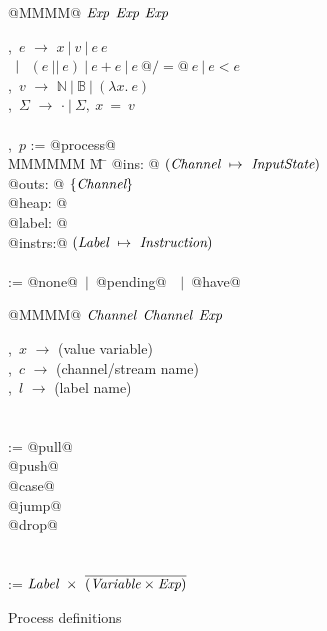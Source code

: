 
\begin{figure}
\begin{minipage}[t]{0.4\textwidth}
\begin{tabbing}
\Instr \TABDEF @MMMM@  \TABSKIP $\textit{Exp}$ \TABSKIP $\textit{Exp}$ \TABSKIP $\textit{Exp}$ \kill

\Exp,~$e$ \> $\to$ \> $x~|~v~|~e~e $ \\
  \> $\enskip|~$ \> $ (e~||~e) ~|~ e+e ~|~ e~@/=@~e ~|~ e < e$ \\
\Value,~$v$ \> $\to$ \> $\mathbb{N}~|~\mathbb{B}~|~(\lambda{}x.~e)$ \\
\Heap,~$\Sigma$ \> $\to$ \> $\cdot~|~\Sigma,~x~=~v$ \\
\\

\Proc,~$p$ \>:=\> @process@ \\
MMMMMM \= M \= \kill
\> \> @ins:   @  $(\textit{Channel} ~\mapsto~ \textit{InputState})$ \\
\> \> @outs:  @  $\{ \textit{Channel} \}$ \\
\> \> @heap:  @  \Heap \\
\> \> @label: @  \Label \\
\> \> @instrs:@  $(\textit{Label} ~\mapsto~ \textit{Instruction})$ \\
\\
\Instr \TABDEF \kill
\InputState \> := \> @none@~$|$~@pending@~\Value~$|$~@have@

\end{tabbing}
\end{minipage}
\begin{minipage}[t]{0.05\textwidth}
\quad
\end{minipage}
\begin{minipage}[t]{0.4\textwidth}
\begin{tabbing}
\Instr \TABDEF @MMMM@  \TABSKIP $\textit{Channel}$ \TABSKIP $\textit{Channel}$ \TABSKIP $\textit{Exp}$ \kill

\Var,~$x$ \> $\to$ \> (value variable) \\
\Chan,~$c$ \> $\to$ \> (channel/stream name) \\
\Label,~$l$ \> $\to$ \> (label name) \\
\\
\\

\Instr
    \> :=\> @pull@  \> \Chan  \> \Var  \> \Next \\
    \TABALT @push@  \> \Chan  \> \Exp  \> \Next \\
    \TABALT @case@  \> \Exp   \> \Next \> \Next \\
    \TABALT @jump@  \>        \>       \> \Next \\
    \TABALT @drop@  \> \Chan  \>       \> \Next \\
\\
\\
\Next \> := \> $\textit{Label}~\times~\overline{(\textit{Variable} \times \textit{Exp})}$ \\
\end{tabbing}
\end{minipage}
\caption{Process definitions}
\label{fig:Process:Def}
\end{figure}

